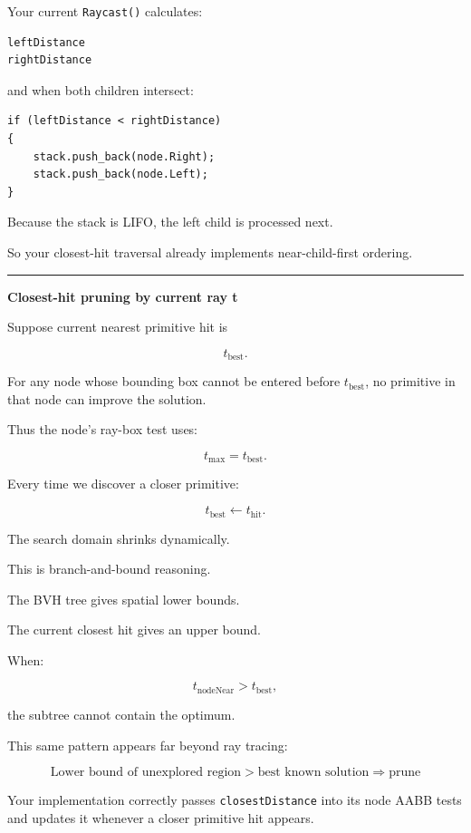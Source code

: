 Your current \texttt{Raycast()} calculates:

\begin{verbatim}
leftDistance
rightDistance
\end{verbatim}

and when both children intersect:

\begin{verbatim}
if (leftDistance < rightDistance)
{
    stack.push_back(node.Right);
    stack.push_back(node.Left);
}
\end{verbatim}

Because the stack is LIFO, the left child is processed next.

So your closest-hit traversal already implements near-child-first ordering.

\begin{center}\rule{0.5\linewidth}{0.5pt}\end{center}

\textbf{Closest-hit pruning by current ray t}

Suppose current nearest primitive hit is

\[
t_{\text{best}}.
\]

For any node whose bounding box cannot be entered before \(t_{\text{best}}\), no primitive in that node can improve the solution.

Thus the node's ray-box test uses:

\[
t_{\max}=t_{\text{best}}.
\]

Every time we discover a closer primitive:

\[
t_{\text{best}}
\leftarrow
t_{\text{hit}}.
\]

The search domain shrinks dynamically.

This is branch-and-bound reasoning.

The BVH tree gives spatial lower bounds.

The current closest hit gives an upper bound.

When:

\[
t_{\text{nodeNear}}>t_{\text{best}},
\]

the subtree cannot contain the optimum.

This same pattern appears far beyond ray tracing:

\[
\boxed{
\text{Lower bound of unexplored region}
>
\text{best known solution}
\Rightarrow
\text{prune}
}
\]

Your implementation correctly passes \texttt{closestDistance} into its node AABB tests and updates it whenever a closer primitive hit appears.

